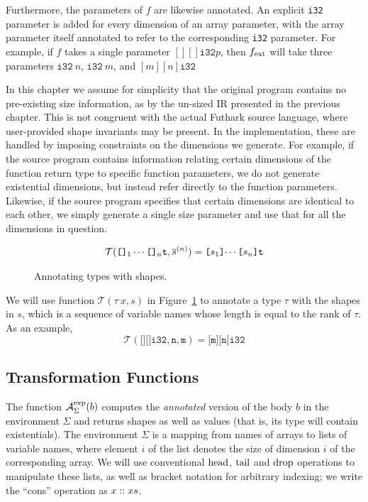 Furthermore, the parameters of \(f\) are likewise annotated.  An
explicit \texttt{i32} parameter is added for every dimension of an
array parameter, with the array parameter itself annotated to refer to
the corresponding \texttt{i32} parameter.  For example, if \(f\) takes
a single parameter \([][]\texttt{i32} p\), then \(f_{\textrm{ext}}\) will take
three parameters \(\texttt{i32}~n\), \(\texttt{i32}~m\), and
\([m][n]\texttt{i32}\)

In this chapter we assume for simplicity that the original program
contains no pre-existing size information, as by the un-sized IR
presented in the previous chapter.  This is not congruent with the
actual Futhark source language, where user-provided shape invariants
may be present.  In the implementation, these are handled by imposing
constraints on the dimensions we generate.  For example, if the source
program contains information relating certain dimensions of the
function return type to specific function parameters, we do not
generate existential dimensions, but instead refer directly to the
function parameters.  Likewise, if the source program specifies that
certain dimensions are identical to each other, we simply generate a
single size parameter and use that for all the dimensions in question.

\begin{figure}[bt]

\begin{align*}
  \mathcal{T}(\texttt{[]}_{1}\cdots\texttt{[]}_n\texttt{t},\overline{s}^{(n)}) = \texttt{[$s_{1}$]$\cdots$[$s_{n}$]\texttt{t}}
\end{align*}%
\caption{Annotating types with shapes.}
\label{fig:annotating bindings}
\end{figure}

We will use function \(\mathcal{T}(\tau~x,s)\) in
Figure~\ref{fig:annotating bindings} to annotate a type \(\tau\) with
the shapes in \(s\), which is a sequence of variable names whose
length is equal to the rank of \(\tau\).  As an example,
\[
\mathcal{T}(\texttt{[][]i32}, \texttt{n}, \texttt{m}) = \texttt{[m][n]i32}
\]

\subsection{Transformation Functions}
\label{sec:TransformationFunctions}

The function \(\mathcal{A}_{\Sigma}^{\text{exp}}(b)\) computes the \textit{annotated}
version of the body \(b\) in the environment \(\Sigma\) and returns
shapes as well as values (that is, its type will contain
existentials).  The environment \(\Sigma\) is a mapping from names of
arrays to lists of variable names, where element \(i\) of the list
denotes the size of dimension \(i\) of the corresponding array.  We
will use conventional \(\textrm{head}\), \(\textrm{tail}\) and \(\textrm{drop}\) operations to
manipulate these lists, as well as bracket notation for arbitrary
indexing; we write the ``cons'' operation as \(x :: xs\).

